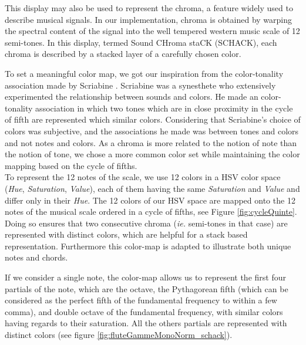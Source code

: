 \documentclass{article}
\begin{document}
This display may also be used to represent the chroma, a feature widely used to describe musical signals. In our implementation, chroma is obtained by warping the spectral content of the signal into the well tempered western music scale of 12 semi-tones. %
In this display, termed Sound CHroma staCK (SCHACK), each chroma is described by a stacked layer of a carefully chosen color. %

To set a meaningful color map, we got our inspiration from the color-tonality association made by Scriabine \cite{Galeyev2001}. Scriabine was a synesthete who extensively experimented the relationship between sounds and colors. He made an color-tonality association in which two tones which are in close proximity in the cycle of fifth are represented which similar colors. Considering that Scriabine's choice of colors was subjective, and the associations he made was between tones and colors and not notes and colors\cite{Galeyev2001}. As a chroma is more related to the notion of note than the notion of tone, we chose a more common color set while maintaining the color mapping based on the cycle of fifths. \\
  
To represent the 12 notes of the scale, we use 12 colors in a HSV color space (\textit{Hue}, \textit{Saturation}, \textit{Value}),  each of them having the same \textit{Saturation} and \textit{Value} and differ only in their \textit{Hue}.  The 12 colors of our HSV space are mapped onto the 12 notes of the musical scale ordered in a cycle of fifths, see Figure \ref{fig:cycleQuinte}. Doing so ensures that two consecutive chroma (\textit{ie.} semi-tones in that case) are represented with distinct colors, which are helpful for a stack based representation. Furthermore this color-map is  adapted to illustrate both unique notes and chords.

If we consider a single note, the color-map allows us to represent the first four partials of the note, which are the octave, the Pythagorean  fifth (which can be considered as the perfect fifth of the fundamental frequency  to within a few comma), and double octave of the fundamental frequency, with similar colors having regards to their saturation. All the others partials are represented with distinct colors (see figure \ref{fig:fluteGammeMonoNorm_schack}). 
\end{document}

